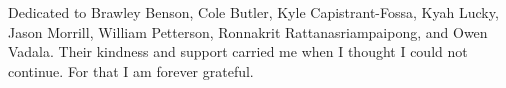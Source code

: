 
\begin{dedication}

Dedicated to Brawley Benson, Cole Butler, Kyle Capistrant-Fossa, Kyah Lucky, Jason Morrill, William Petterson, Ronnakrit Rattanasriampaipong, and Owen Vadala. Their kindness and support carried me when I thought I could not continue. For that I am forever grateful. 

\end{dedication}